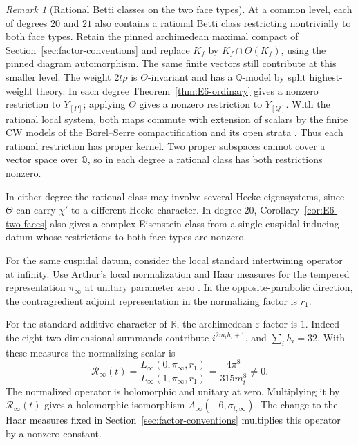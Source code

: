 \documentclass[12pt]{amsart}
\numberwithin{equation}{section}
\theoremstyle{plain}
\theoremstyle{definition}
\theoremstyle{remark}
\newtheorem{remark}[theorem]{Remark}
\newcommand{\Q}{\mathbb Q}
\newcommand{\R}{\mathbb R}
\begin{document}
\begin{remark}[Rational Betti classes on the two face types]
At a common level, each of degrees $20$ and $21$ also contains a rational Betti class restricting nontrivially to both face types. Retain the pinned archimedean maximal compact of Section~\ref{sec:factor-conventions} and replace $K_f$ by $K_f\cap\Theta(K_f)$, using the pinned diagram automorphism. The same finite vectors still contribute at this smaller level. The weight $2t\rho$ is $\Theta$-invariant and has a $\Q$-model by split highest-weight theory. In each degree Theorem~\ref{thm:E6-ordinary} gives a nonzero restriction to $Y_{[P]}$; applying $\Theta$ gives a nonzero restriction to $Y_{[Q]}$. With the rational local system, both maps commute with extension of scalars by the finite CW models of the Borel--Serre compactification and its open strata \cite{BorelSerre1973}. Thus each rational restriction has proper kernel. Two proper subspaces cannot cover a vector space over $\Q$, so in each degree a rational class has both restrictions nonzero.

In either degree the rational class may involve several Hecke eigensystems, since \(\Theta\) can carry \(\chi'\) to a different Hecke character. In degree \(20\), Corollary~\ref{cor:E6-two-faces} also gives a complex Eisenstein class from a single cuspidal inducing datum whose restrictions to both face types are nonzero.
\end{remark}


For the same cuspidal datum, consider the local standard intertwining operator at infinity. Use Arthur's local normalization and Haar measures for the tempered representation $\pi_\infty$ at unitary parameter zero \cite[Thm.~2.1 and \S3, (3.2)]{Arthur1989Intertwining}. In the opposite-parabolic direction, the contragredient adjoint representation in the normalizing factor is $r_1$.

For the standard additive character of $\R$, the archimedean $\varepsilon$-factor is $1$. Indeed the eight two-dimensional summands contribute $i^{2m_t h_i+1}$, and $\sum_i h_i=32$. With these measures the normalizing scalar is
\[
 \mathcal R_\infty(t)
 =\frac{L_\infty(0,\pi_\infty,r_1)}
        {L_\infty(1,\pi_\infty,r_1)}
 =\frac{4\pi^8}{315m_t^8}\ne0.
\]
The normalized operator is holomorphic and unitary at zero. Multiplying it by $\mathcal R_\infty(t)$ gives a holomorphic isomorphism $A_\infty(-6,\sigma_{t,\infty})$. The change to the Haar measures fixed in Section~\ref{sec:factor-conventions} multiplies this operator by a nonzero constant.
\end{document}
